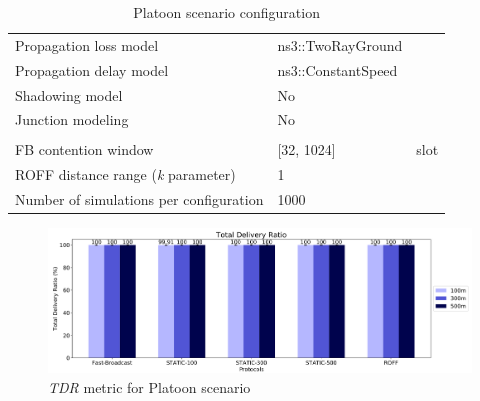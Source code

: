 \begin{table}[H]
\begin{tabularx}{\textwidth}{l | l  l}
				Propagation loss model					& ns3::TwoRayGround 	&		\\
				Propagation delay model					& ns3::ConstantSpeed	&		\\
				Shadowing model							& No					&		\\
				Junction modeling						& No					&		\\
				\midrule[1pt]
				\rowcolor{P} \multicolumn{3}{c}{Protocols configuration} \\
				\midrule[1pt]
				FB contention window					& [32, 1024]			& slot	\\
				ROFF distance range (\textit{k} parameter) & 1					&		\\	
				\midrule[1pt]
				Number of simulations per configuration	& 1000					&		\\
				\bottomrule
			\end{tabularx}
			\caption{Platoon scenario configuration}
			\label{table:platoon}
		\end{table}
	
		\begin{figure}[H]
			\centering
			\includegraphics[width=1.1\textwidth]{immagini/platoon-15km/tdr}
			\caption{\textit{TDR} metric for Platoon scenario}
			\label{fig:metric-platoon-15km-0}
		\end{figure}
	
